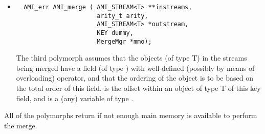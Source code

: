 \begin{itemize}
\item
\begin{verbatim}
  AMI_err AMI_merge ( AMI_STREAM<T> **instreams,
                      arity_t arity,
                      AMI_STREAM<T> *outstream,
                      KEY dummy,
                      MergeMgr *mmo);
\end{verbatim}
The third polymorph assumes that the objects (of type T) in the streams
being merged have a field (of type ) with well-defined (possibly
by means of overloading) \myverb{<} operator, and that the ordering of the
object is to be based on the total order of this field.  is
the offset within an object of type T of this key field, and  is
a (any) variable of type .

\end{itemize}

All of the   polymorphs return
 if not enough
main memory is available to perform the merge.



